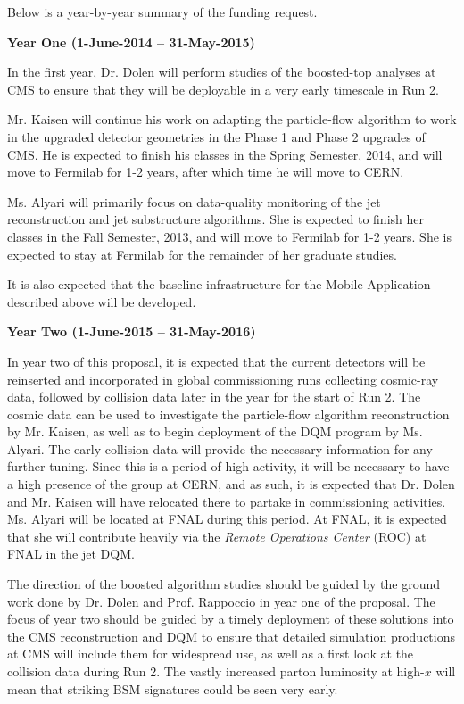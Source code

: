 \documentclass[12pt]{proposalnsf}
\begin{document}
Below is a year-by-year summary of the funding request. 

\bigskip
\bigskip
{\bf \Large Year One (1-June-2014 -- 31-May-2015)}
\bigskip

In the first year, Dr. Dolen will perform studies of the
boosted-top analyses at CMS to ensure that they will be
deployable in a very early timescale in Run 2. 

Mr. Kaisen will continue his work on adapting the particle-flow
algorithm to work in the upgraded detector geometries in the Phase 1
and Phase 2 upgrades of CMS. He is expected to finish his classes in
the Spring Semester, 2014, and will move to Fermilab for 1-2 years,
after which time he will move to CERN. 

Ms. Alyari will primarily focus on data-quality monitoring of the jet
reconstruction and jet substructure algorithms. She is expected to
finish her classes in the Fall Semester, 2013, and will move to
Fermilab for 1-2 years. She is expected to stay at Fermilab for the
remainder of her graduate studies. 

It is also expected that the baseline infrastructure for the Mobile
Application described above will be developed. 


\bigskip
\bigskip
{\bf \Large Year Two (1-June-2015 -- 31-May-2016)}
\bigskip


In year two of this proposal, it is expected that the current
detectors will be reinserted and incorporated in global commissioning
runs collecting cosmic-ray data, followed by collision data later in the
year for the start of Run 2. The cosmic data can be used to investigate the
particle-flow algorithm reconstruction by Mr. Kaisen, as well as to
begin deployment of the DQM program by Ms. Alyari. The early collision
data will provide the necessary information for any further
tuning. Since this is a period of high activity, it
will be necessary to have a high presence of the group at CERN, and
as such, it is expected that Dr. Dolen and
Mr. Kaisen will have relocated there to partake in commissioning
activities. 
Ms. Alyari will be located at FNAL during this period. At FNAL, it is
expected that she will contribute heavily via the {\em Remote
  Operations Center} (ROC) at FNAL in the jet DQM.

The direction of the boosted algorithm studies should be guided by the
ground work done by Dr. Dolen and Prof. Rappoccio in year one of the proposal. 
The focus of year two should be guided by a timely deployment of these
solutions into the CMS reconstruction and DQM to ensure that
detailed simulation productions at CMS will include them for
widespread use, as well as a first look at the collision data during
Run 2. The vastly increased parton
luminosity at high-$x$ will mean that striking BSM signatures could be
seen very early. 
\end{document}
